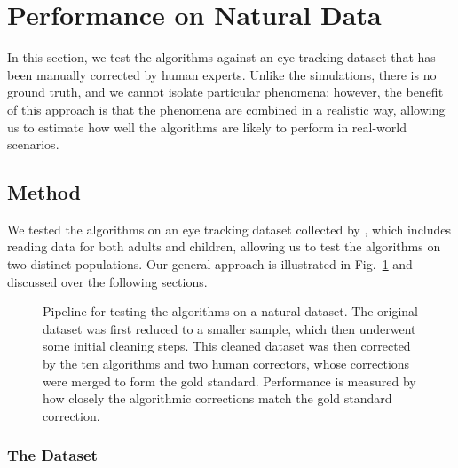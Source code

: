 \documentclass[doc,biblatex]{apa7}
\begin{document}
\section{Performance on Natural Data}

In this section, we test the algorithms against an eye tracking dataset that has been manually corrected by human experts. Unlike the simulations, there is no ground truth, and we cannot isolate particular phenomena; however, the benefit of this approach is that the phenomena are combined in a realistic way, allowing us to estimate how well the algorithms are likely to perform in real-world scenarios.

\subsection{Method}

We tested the algorithms on an eye tracking dataset collected by \textcite{Pescuma:0000}, which includes reading data for both adults and children, allowing us to test the algorithms on two distinct populations. Our general approach is illustrated in Fig.~\ref{fig06} and discussed over the following sections.

	\begin{figure}
	\vspace*{2pt}
	\caption{Pipeline for testing the algorithms on a natural dataset. The original dataset was first reduced to a smaller sample, which then underwent some initial cleaning steps. This cleaned dataset was then corrected by the ten algorithms and two human correctors, whose corrections were merged to form the gold standard. Performance is measured by how closely the algorithmic corrections match the gold standard correction.}
	\label{fig06}
	\end{figure}

\subsubsection{The Dataset}
\end{document}
